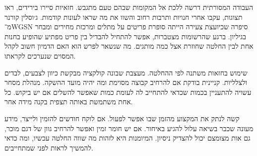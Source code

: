 

\vspace{6mm}

{\fontsize{16}{25}\selectfont

העבודה המסורתית דרשה ללכת אל המקומות שבהם טעם מתגבש. חזאיות סיירו בירידים, ראו תצוגות, עקבו אחרי חנויות ותרבות רחוב והשוו את מה שראו לעונות קודמות. ג׳וסלין קורנר מ־\textenglish{WGSN} סיפרה שכיועצת צעירה הייתה סופרת פריטים על מתלים ומרכזת מחירים ומבחר בגיליון. ברגע שהרשומות מצטברות, אפשר להתחיל להבדיל בין פריט מפתיע שהופיע בחנות אחת לבין החלטה שחוזרת אצל כמה מותגים. מה שנשאר לפרש הוא האם הדמיון חשוב לקהל המסוים שנערכים לקראתו. 

שימוש בחזאות משתנה לפי ההחלטה. מעצבת שבונה קולקציה מבקשת כיוון לצבעים, לבדים ולצלליות. קניינית בודקת אם להרחיב קבוצה מסוימת ומה יהיה מועד ההשקה. מנהלת מסחר עשויה להתעניין בכמות שכדאי להתחייב לה לעומת כמות שאפשר להשלים אם יש ביקוש. כל אחת משתמשת באותה תצפית בקנה מידה אחר. 

קשה לנתק את המקצוע מהזמן שבו אפשר לפעול. אם לוקח חודשים להזמין ולייצר, מידע מעונה שכבר בשיאה עלול להגיע באיחור. אם יש חומר זמין ואפשר להרחיב גוון של דגם מוכר, גם אות מצומצם יכול להצדיק ניסיון. המיומנות היא לזהות מה שווה החלטה עכשיו, ומה כדאי להמשיך לראות לפני שמתחייבים.

\par}
